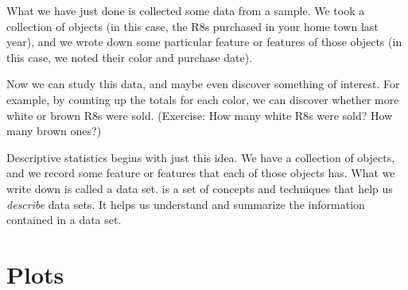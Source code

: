 What we have just done is collected some data from a sample. We took a collection of objects (in this case, the R8s purchased in your home town last year), and we wrote down some particular feature or features of those objects (in this case, we noted their color and purchase date).

Now we can study this data, and maybe even discover something of interest. For example, by counting up the totals for each color, we can discover whether more white or brown R8s were sold. (Exercise: How many white R8s were sold? How many brown ones?)

Descriptive statistics begins with just this idea. We have a collection of objects, and we record some feature or features that each of those objects has. What we write down is called a data set.  is a set of concepts and techniques that help us \emph{describe} data sets. It helps us understand and summarize the information contained in a data set.




\section{Plots}

\begin{center}
\end{center}

